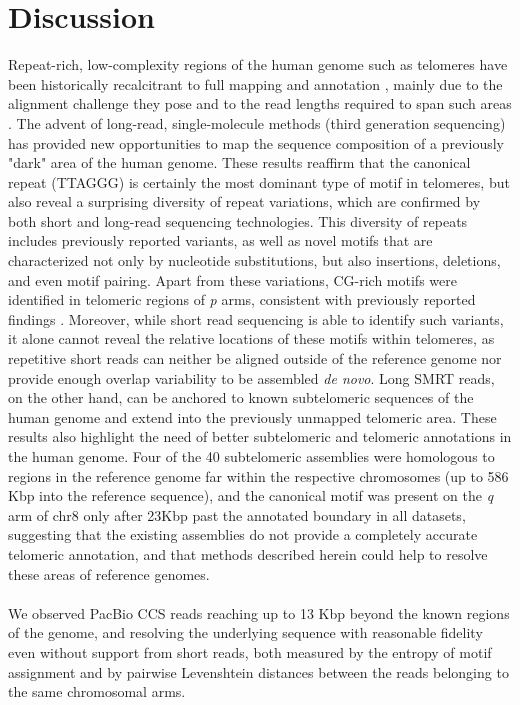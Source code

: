 \documentclass{article}
\begin{document}
\section*{Discussion} 
Repeat-rich, low-complexity regions of the human genome such as telomeres have been historically recalcitrant to full mapping and annotation \cite{miga2015}, mainly due to the alignment challenge they pose and to the read lengths required to span such areas \cite{ngslowcomplexity}.
The advent of long-read, single-molecule methods (third generation sequencing) has provided new opportunities to map the sequence composition of a previously "dark" area of the human genome.
These results reaffirm that the canonical repeat (TTAGGG) is certainly the most dominant type of motif in telomeres, but also reveal a surprising diversity of repeat variations, which are confirmed by both short and long-read sequencing technologies.
This diversity of repeats includes previously reported variants, as well as novel motifs that are characterized not only by nucleotide substitutions, but also insertions, deletions, and even motif pairing.
Apart from these variations, CG-rich motifs were identified in telomeric regions of \textit{p} arms, consistent with previously reported findings \cite{cpg}.
Moreover, while short read sequencing is able to identify such variants, it alone cannot reveal the relative locations of these motifs within telomeres, as repetitive short reads can neither be aligned outside of the reference genome nor provide enough overlap variability to be assembled \textit{de novo}.
Long SMRT reads, on the other hand, can be anchored to known subtelomeric sequences of the human genome and extend into the previously unmapped telomeric area.
These results also highlight the need of better subtelomeric and telomeric annotations in the human genome.
Four of the 40 subtelomeric assemblies \cite{riethman2014} were homologous to regions in the reference genome far within the respective chromosomes (up to 586 Kbp into the reference sequence), and the canonical motif was present on the \textit{q} arm of chr8 only after 2\textendash{}3Kbp past the annotated boundary in all datasets, suggesting that the existing assemblies do not provide a completely accurate telomeric annotation, and that methods described herein could help to resolve these areas of reference genomes.
\\~\\
We observed PacBio CCS reads reaching up to 13 Kbp beyond the known regions of the genome, and resolving the underlying sequence with reasonable fidelity \textendash{} even without support from short reads, \textendash{} both measured by the entropy of motif assignment and by pairwise Levenshtein distances between the reads belonging to the same chromosomal arms.
\end{document}
